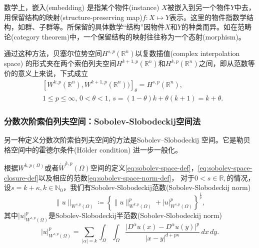 \begin{definition}[嵌入]
  \label{definition:sobolev-spaces-embeddings}
  数学上，嵌入(embedding) 是指某个物件(instance) $X$被嵌入到另一个物件$Y$中去，用保留结构的映射(structure-preserving map)$f: X \mapsto Y$表示。这里的物件指数学结构，如群、子群等。所保留的具体数学``结构''因物件$X$和$Y$的种类而异。如在范畴论(category theorem)中，一个保留结构的映射往往称为一个态射(morphism)。
\end{definition}

通过这种方法，贝塞尔位势空间$H^{s,p}(\mathbb{R}^n)$以复数插值(complex interpolation space) 的形式夹在两个索伯列夫空间$H^{k+1,p}(\mathbb{R}^n)$和$H^{k,p}(\mathbb{R}^n)$之间，即从范数等价的意义上来说，下式成立
\begin{equation*}
\begin{split}
  &\left[W^{k,p}(\mathbb{R}^n), W^{k+1,p}(\mathbb{R}^n))
  \right]_{\theta} = H^{s,p}(\mathbb{R}^n), \\
  &1 \le p \le \infty, \, 0 < \theta <1, \, s = (1-\theta) k + \theta (k+1) = k + \theta.
\end{split}
\end{equation*}

\subsubsection{分数次阶索伯列夫空间：Sobolev-Slobodeckij空间法}
另一种定义分数次阶索伯列夫空间的方法是Sobolev–Slobodeckij 空间。它是勒贝格空间中的霍德尔条件(Hölder condition) 进一步一般化。

根据$W^{k,p(\Omega)}$或者$\mathring{W}^{k,p}(\Omega)$空间的定义\eqref{eq:sobolev-space-def}，\eqref{eq:sobolev-space-closure-def}以及相应的范数\eqref{eq:sobolev-space-norm-def}，
对于$0 < s \in \mathbb{R}, $的情况，设$s = k + \kappa, k \in \mathbb{N}_0$，我们有Sobolev-Slobodeckij范数(Sobolev-Slobodeckij norm)
\begin{equation*}
  \|u\|_{W^{s,p}(\Omega)} \coloneqq \left\{
  \|u\|^{p}_{W^{k,p}(\Omega)} + \left| u \right|^{p}_{W^{s,p}(\Omega)}
  \right\}^{\frac{1}{p}},
\end{equation*}
其中$\left| u \right|^p_{W^{s,p}(\Omega)}$是Sobolev-Slobodeckij半范数(Sobolev-Slobodeckij norm)
\begin{equation*}
  \left| u \right|^p_{W^{s,p}(\Omega)} = \sum_{\left| \alpha \right| = k} \int_{\Omega} \int_{\Omega} \frac{
  \big| D^{\alpha}u(x) - D^{\alpha} u(y) \big|^{p}
  }{
  \big| x - y\big|^{d + p \kappa}
  }\, dx \, dy.
\end{equation*}

